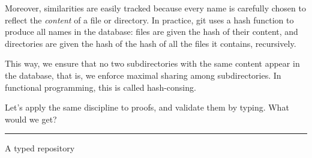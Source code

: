 \documentclass[ignorenonframetext,red]{beamer}
\begin{document}
Moreover, similarities are easily tracked because every name is
carefully chosen to reflect the \emph{content} of a file or directory.
In practice, \textsf{git} uses a hash function to produce all names in
the database: files are given the hash of their content, and
directories are given the hash of the hash of all the files it
contains, recursively.

This way, we ensure that no two subdirectories with the same content
appear in the database, that is, we enforce maximal sharing among
subdirectories. In functional programming, this is called
hash-consing.

Let's apply the same discipline to proofs, and validate them by
typing. What would we get?

\hrule
\begin{frame}{A typed repository}

\end{frame}
\end{document}
